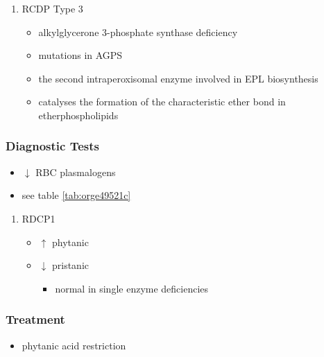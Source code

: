 \documentclass[12pt]{scrartcl}
\begin{document}
\begin{enumerate}
\item RCDP Type 3
\label{sec:orge1bc85c}
\begin{itemize}
\item alkylglycerone 3-phosphate synthase deficiency
\item mutations in AGPS
\item the second intraperoxisomal enzyme involved in EPL biosynthesis
\item catalyses the formation of the characteristic ether bond in etherphospholipids
\end{itemize}
\end{enumerate}

\subsubsection{Diagnostic Tests}
\label{sec:org4de954f}
\begin{itemize}
\item \(\downarrow\) RBC plasmalogens
\item see table \ref{tab:orge49521c}
\end{itemize}
\begin{enumerate}
\item RDCP1
\label{sec:org7c5f8fa}
\begin{itemize}
\item \(\uparrow\) phytanic
\item \(\downarrow\) pristanic
\begin{itemize}
\item normal in single enzyme deficiencies
\end{itemize}
\end{itemize}
\end{enumerate}

\subsubsection{Treatment}
\label{sec:org222d441}
\begin{itemize}
\item phytanic acid restriction
\end{itemize}
\end{document}
